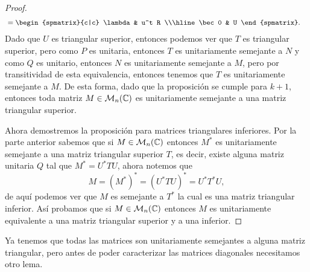 \begin{proof}
\begin{align*}
    &= \begin{spmatrix}{c|c} \lambda & u^t R \\\hline \bec 0 & U \end{spmatrix}.
  \end{align*}
  Dado que $U$ es triangular superior, entonces podemos ver que $T$ es triangular superior, pero como $P$ es unitaria, entonces $T$ es unitariamente semejante a $N$ y como $Q$ es unitario, entonces $N$ es unitariamente semejante a $M$, pero por transitividad de esta equivalencia, entonces tenemos que $T$ es unitariamente semejante a $M$. De esta forma, dado que la proposición se cumple para $k+1$, entonces toda matriz $M \in \mathcal{M}_n(\mathbb{C})$ es unitariamente semejante a una matriz triangular superior.
  
  Ahora demostremos la proposición para matrices triangulares inferiores. Por la parte anterior sabemos que si $M \in \mathcal{M}_n(\mathbb{C})$ entonces $M^*$ es unitariamente semejante a una matriz triangular superior $T$, es decir, existe alguna matriz unitaria $Q$ tal que $M^* = U^* T U$, ahora notemos que
  \[ M = (M^*)^* = (U^* T U)^* = U^* T^* U,\]
  de aquí podemos ver que $M$ es semejante a $T^*$ la cual es una matriz triangular inferior. Así probamos que si $M \in \mathcal{M}_n(\mathbb{C})$ entonces $M$ es unitariamente equivalente a una matriz triangular superior y a una inferior.
  \end{proof}

  Ya tenemos que todas las matrices son unitariamente semejantes a alguna matriz triangular, pero antes de poder caracterizar las matrices diagonales necesitamos otro lema.

